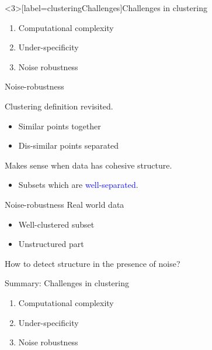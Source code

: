 \documentclass{beamer}
\begin{document}
\begin{frame}<3>[label=clusteringChallenges]{Challenges in clustering}
	\begin{enumerate}
		 \item Computational complexity
		\onslide<2> \vspace{20pt}\item  Under-specificity
		\onslide<3>\vspace{20pt}\item Noise robustness
	\end{enumerate}
\end{frame}

\begin{frame}{Noise-robustness}
	
	Clustering definition revisited.
	\begin{block}{}
		\begin{itemize}
			\item Similar points together
			\item Dis-similar points separated
		\end{itemize}
	\end{block}
	
	\vspace{30pt}Makes sense when data has cohesive structure.
	\begin{itemize}
		\vspace{10pt}\item Subsets which are \textcolor{blue}{well-separated}.
	\end{itemize}
\end{frame}

\begin{frame}{Noise-robustness}
	Real world data
	\begin{itemize}
		\vspace{10pt}\item Well-clustered subset
		\vspace{5pt}\item Unstructured part
	\end{itemize}
	
	\vspace{25pt}How to detect structure in the presence of noise?
\end{frame}

\begin{frame}{Summary: Challenges in clustering}
	\begin{enumerate}
		\item Computational complexity
		\vspace{20pt}\item  Under-specificity
		\vspace{20pt}\item Noise robustness
	\end{enumerate}
\end{frame}
\end{document}
